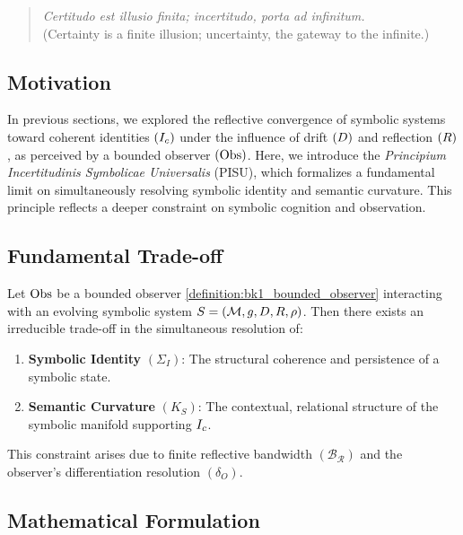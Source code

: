 \begin{quote}
\textit{Certitudo est illusio finita; incertitudo, porta ad infinitum.}\\
(Certainty is a finite illusion; uncertainty, the gateway to the infinite.)
\end{quote}

\subsection{Motivation}
\label{subsec:bk7_pisu_motivation}
In previous sections, we explored the reflective convergence of symbolic systems toward coherent identities $(I_c)$ under the influence of drift $(D)$ and reflection $(R)$, as perceived by a bounded observer $(\mathrm{Obs})$. Here, we introduce the \emph{Principium Incertitudinis Symbolicae Universalis} (PISU), which formalizes a fundamental limit on simultaneously resolving symbolic identity and semantic curvature. This principle reflects a deeper constraint on symbolic cognition and observation.

\subsection{Fundamental Trade-off}
\label{subsec:bk7_pisu_axiom_statement}

\begin{axiom}
\label{axiom:bk7_pisu_axiom}
Let $\mathrm{Obs}$ be a bounded observer \ref{definition:bk1_bounded_observer} interacting with an evolving symbolic system $S = (\mathcal{M}, g, D, R, \rho)$. Then there exists an irreducible trade-off in the simultaneous resolution of:
\begin{enumerate}
    \item \textbf{Symbolic Identity} $(\Sigma_I)$: The structural coherence and persistence of a symbolic state.
    \item \textbf{Semantic Curvature} $(K_S)$: The contextual, relational structure of the symbolic manifold supporting $I_c$.
\end{enumerate}
This constraint arises due to finite reflective bandwidth $(\mathcal{B_R})$ and the observer's differentiation resolution $(\delta_O)$.
\end{axiom}

\subsection{Mathematical Formulation}
\label{subsec:bk7_pisu_formula}

